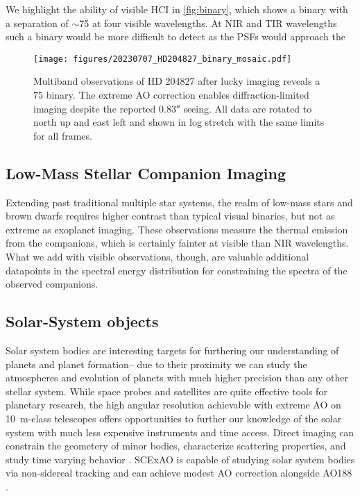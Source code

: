 We highlight the ability of visible HCI in \autoref{fig:binary}, which shows a binary with a separation of $\sim$\SI{75}{\mas} at four visible wavelengths. At NIR and TIR wavelengths such a binary would be more difficult to detect as the PSFs would approach the

\begin{figure}
    \centering
    \texttt{[image: figures/20230707\_HD204827\_binary\_mosaic.pdf]}
    \caption{Multiband observations of HD 204827 after lucky imaging reveals a \SI{75}{\mas} binary. The extreme AO correction enables diffraction-limited imaging despite the reported \ang{;;0.83} seeing. All data are rotated to north up and east left and shown in log stretch with the same limits for all frames.\label{fig:binary}}
\end{figure}

\subsection{Low-Mass Stellar Companion Imaging}

Extending past traditional multiple star systems, the realm of low-mass stars and brown dwarfs requires higher contrast than typical visual binaries, but not as extreme as exoplanet imaging. These observations measure the thermal emission from the companions, which is certainly fainter at visible than NIR wavelengths. What we add with visible observations, though, are valuable additional datapoints in the spectral energy distribution for constraining the spectra of the observed companions.

\subsection{Solar-System objects}

Solar system bodies are interesting targets for furthering our understanding of planets and planet formation-- due to their proximity we can study the atmospheres and evolution of planets with much higher precision than any other stellar system. While space probes and satellites are quite effective tools for planetary research, the high angular resolution achievable with extreme AO on \SI{10}{\meter}-class telescopes offers opportunities to further our knowledge of the solar system with much less expensive instruments and time access. Direct imaging can constrain the geometery of minor bodies, characterize scattering properties, and study time varying behavior \citep{schmid_limb_2006,vernazza_vltsphere_2021}. SCExAO is capable of studying solar system bodies via non-sidereal tracking and can achieve modest AO correction alongside AO188 \citep{groff_first_2017}.

